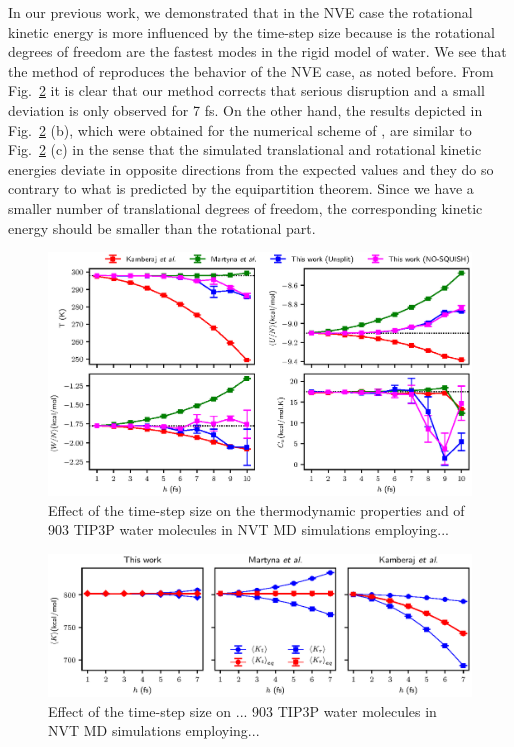 \documentclass[
journal=jctcce,
layout=twocolumn
]{achemso}
\begin{document}
In our previous work\cite{Silveira_2017}, we demonstrated that in the NVE case the rotational kinetic energy is more influenced by the time-step size because is the rotational degrees of freedom are the fastest modes in the rigid model of water. 
We see that the method of \citeauthor{Kamberaj_2005} \cite{Kamberaj_2005} reproduces the behavior of the NVE case, as noted before.
From Fig.~\ref{fig:energy_partition} it is clear that our method corrects that serious disruption and a small deviation is only observed for 7 fs.
On the other hand, the results depicted in Fig.~\ref{fig:energy_partition} (b), which were obtained for the numerical scheme of \citeauthor{Martyna_1996} \cite{Martyna_1996}, are similar to Fig.~\ref{fig:energy_partition} (c) in the sense that the simulated translational and rotational kinetic energies deviate in opposite directions from the expected values and they do so contrary to what is predicted by the equipartition theorem.
Since we have a smaller number of translational degrees of freedom, the corresponding kinetic energy should be smaller than the rotational part.

\begin{figure}
	\includegraphics{Figures/thermodynamic_properties.eps}
	\caption{Effect of the time-step size on the thermodynamic properties and of 903 TIP3P\cite{Jorgensen_1983} water molecules in NVT MD simulations employing...}
	\label{fig:properties}
\end{figure}

\begin{figure}
	\includegraphics{Figures/energy_partition.eps}
		\caption{Effect of the time-step size on ... 903 TIP3P\cite{Jorgensen_1983} water molecules in NVT MD simulations employing...}
	\label{fig:energy_partition}
\end{figure}
\end{document}
